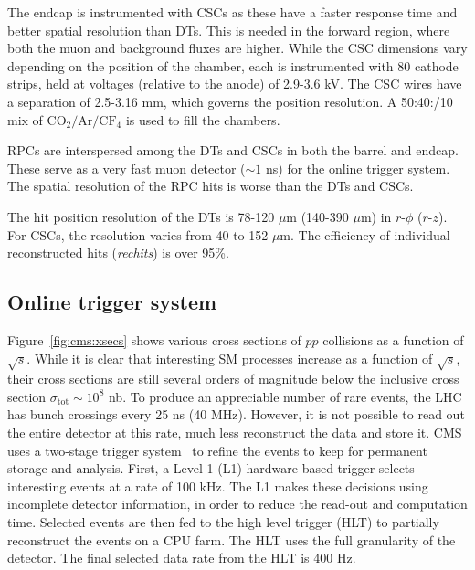 The endcap is instrumented with CSCs as these have a faster response time and better spatial resolution than DTs.
This is needed in the forward region, where both the muon and background fluxes are higher.
While the CSC dimensions vary depending on the position of the chamber, each is instrumented with 80 cathode strips, held at voltages (relative to the anode) of 2.9-3.6 kV.
The CSC wires have a separation of 2.5-3.16 mm, which governs the position resolution.
A 50:40:/10 mix of $\mathrm{CO}_2/\mathrm{Ar}/\mathrm{CF}_4$ is used to fill the chambers.

RPCs are interspersed among the DTs and CSCs in both the barrel and endcap. 
These serve as a very fast muon detector ($\sim 1$ ns) for the online trigger system. 
The spatial resolution of the RPC hits is worse than the DTs and CSCs.

The hit position resolution of the DTs is 78-120 $\mu$m (140-390 $\mu$m) in $r$-$\phi$ ($r$-$z$).
For CSCs, the resolution varies from 40 to 152 $\mu$m.
The efficiency of individual reconstructed hits (\emph{rechits}) is over 95\%.

\subsection{Online trigger system}

Figure~\ref{fig:cms:xsecs} shows various cross sections of $pp$ collisions as a function of $\sqrt{s}$.
While it is clear that interesting SM processes increase as a function of $\sqrt{s}$, their cross sections are still several orders of magnitude below the inclusive cross section $\sigma_\mathrm{tot}\sim 10^8$ nb.
To produce an appreciable number of rare events, the LHC has bunch crossings every 25 ns (40 MHz).
However, it is not possible to read out the entire detector at this rate, much less reconstruct the data and store it.
CMS uses a two-stage trigger system~\cite{cmstrig} to refine the events to keep for permanent storage and analysis.
First, a Level 1 (L1) hardware-based trigger selects interesting events at a rate of 100 kHz.
The L1 makes these decisions using incomplete detector information, in order to reduce the read-out and computation time.
Selected events are then fed to the high level trigger (HLT) to partially reconstruct the events on a CPU farm.
The HLT uses the full granularity of the detector.
The final selected data rate from the HLT is 400 Hz.

